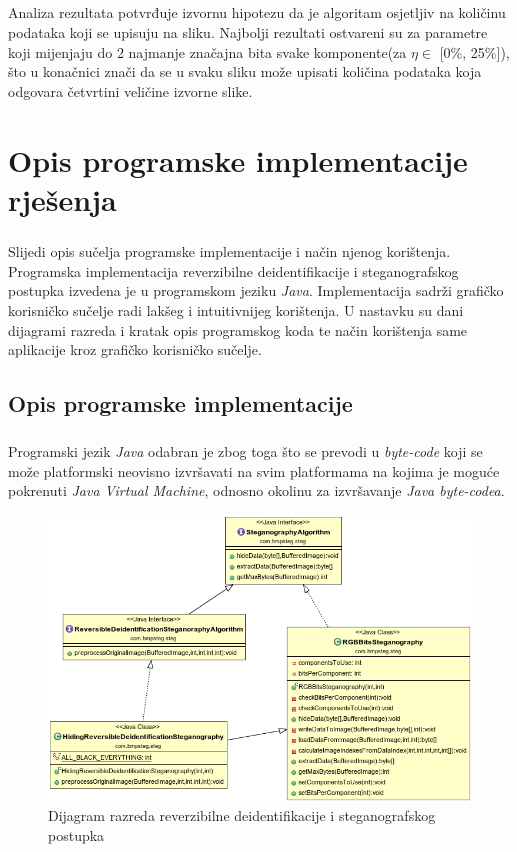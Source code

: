 \documentclass[times, utf8, seminar]{fer}
\begin{document}
\paragraph{}
Analiza rezultata potvrđuje izvornu hipotezu da je algoritam osjetljiv na količinu podataka koji se upisuju na sliku. Najbolji rezultati ostvareni su za parametre koji mijenjaju do 2 najmanje značajna bita svake komponente(za $\eta \in$ [0\%, 25\%]), što u konačnici znači da se u svaku sliku može upisati količina podataka koja odgovara četvrtini veličine izvorne slike.
\chapter{Opis programske implementacije rješenja}
\paragraph{}
Slijedi opis sučelja programske implementacije i način njenog korištenja. Programska implementacija reverzibilne deidentifikacije i steganografskog postupka izvedena je u programskom jeziku \textit{Java}. Implementacija sadrži grafičko korisničko sučelje radi lakšeg i intuitivnijeg korištenja. U nastavku su dani dijagrami razreda i kratak opis programskog koda te način korištenja same aplikacije kroz grafičko korisničko sučelje.

\section{Opis programske implementacije}
\paragraph{}
Programski jezik \textit{Java} odabran je zbog toga što se prevodi u \textit{byte-code} koji se može platformski neovisno izvršavati na svim platformama na kojima je moguće pokrenuti \textit{Java Virtual Machine}, odnosno okolinu za izvršavanje \textit{Java byte-codea}.

\begin{figure}
\caption{Dijagram razreda reverzibilne deidentifikacije i steganografskog postupka}
\label{steg_class_diagram}
\centerline{\includegraphics[scale=0.4]{images/steg_class_diagram.png}}
\end{figure}
\end{document}
